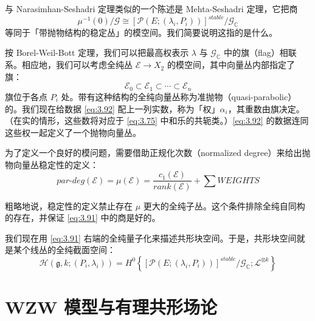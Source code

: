 与 Narasimhan-Seshadri 定理类似的一个陈述是 Mehta-Seshadri 定理，它把商
\begin{equation}
  \mu^{-1}(0)/\mathcal{G}\cong[\mathcal{P}(E;(\lambda_i,P_i))]^{stable}/\mathcal{G}_{\mathbb{C}}
  \tag{3.91}
  \label{eq:3.91}
\end{equation}
等同于「带抛物结构的稳定丛」的模空间。我们简要说明这指的是什么。

按 Borel-Weil-Bott 定理，我们可以把最高权表示 $\lambda$ 与 $\mathcal{G}_{\mathbb{C}}$ 中的旗（flag）相联系。相应地，我们可以考虑全纯丛 $\mathcal{E}\to X_2$ 的模空间，其中向量丛内部指定了旗：
\begin{equation}
  \mathcal{E}_0\subset\mathcal{E}_1\subset\cdots\subset\mathcal{E}_n
  \tag{3.92}
  \label{eq:3.92}
\end{equation}
旗位于各点 $P_i$ 处。带有这种结构的全纯向量丛称为准抛物（quasi-parabolic）的。我们现在给数据 \eqref{eq:3.92} 配上一列实数，称为「权」$\alpha_i$，其重数由旗决定。（在实的情形，这些数将对应于 \eqref{eq:3.75} 中和乐的共轭类。）\eqref{eq:3.92} 的数据连同这些权一起定义了一个抛物向量丛。

为了定义一个良好的模问题，需要借助正规化次数（normalized degree）来给出抛物向量丛稳定性的定义：
\begin{equation}
  \mathit{par}\text{-}\mathit{deg}(\mathcal{E})=\mu(\mathcal{E})=\frac{c_1(\mathcal{E})}{\mathit{rank}(\mathcal{E})}+\sum\mathit{WEIGHTS}
  \tag{3.93}
  \label{eq:3.93}
\end{equation}

粗略地说，稳定性的定义禁止存在 $\mu$ 更大的全纯子丛。这个条件排除全纯自同构的存在，并保证 \eqref{eq:3.91} 中的商是好的。

我们现在用 \eqref{eq:3.91} 右端的全纯量子化来描述共形块空间。于是，共形块空间就是某个线丛的全纯截面空间：
\begin{equation}
  \mathcal{H}(\mathfrak{g},k;(P_i,\lambda_i))
  =H^0\left\{[\mathcal{P}(E;(\lambda_i,P_i))]^{stable}/\mathcal{G}_{\mathbb{C}};\mathcal{L}^{\otimes k}\right\}
  \tag{3.94}
  \label{eq:3.94}
\end{equation}

\section{WZW 模型与有理共形场论} %

